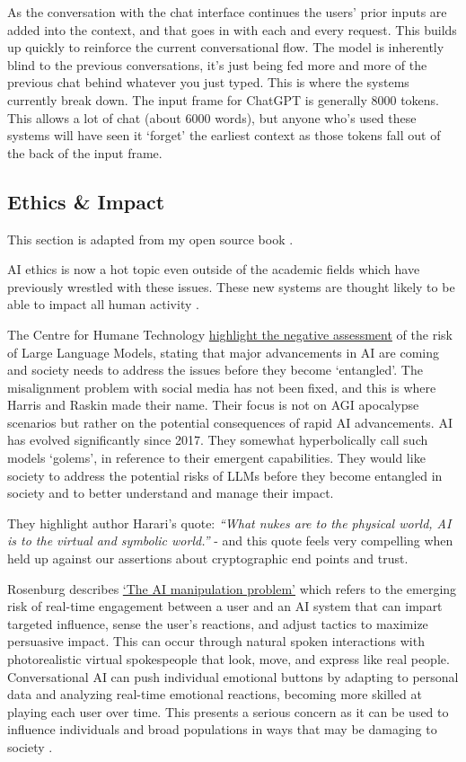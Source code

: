 As the conversation with the chat interface continues the users' prior inputs are added into the context, and that goes in with each and every request. This builds up quickly to reinforce the current conversational flow. The model is inherently blind to the previous conversations, it's just being fed more and more of the previous chat behind whatever you just typed. This is where the systems currently break down. The input frame for ChatGPT is generally 8000 tokens. This allows a lot of chat (about 6000 words), but anyone who's used these systems will have seen it `forget' the earliest context as those tokens fall out of the back of the input frame.\par 
\subsection{Ethics \& Impact}
This section is adapted from my open source book \cite{ohare2022money}.\par
AI ethics is now a hot topic even outside of the academic fields which have previously wrestled with these issues. These new systems are thought likely to be able to impact all human activity \cite{eloundou2023gpts}. \par
The Centre for Humane Technology \href{https://www.humanetech.com/key-issues}{highlight the negative assessment} of the risk of Large Language Models, stating that major advancements in AI are coming and society needs to address the issues before they become `entangled'. The misalignment problem with social media has not been fixed, and this is where Harris and Raskin made their name. Their focus is not on AGI apocalypse scenarios but rather on the potential consequences of rapid AI advancements. AI has evolved significantly since 2017. They somewhat hyperbolically call such models `golems', in reference to their emergent capabilities. They would like society to address the potential risks of LLMs before they become entangled in society and to better understand and manage their impact.\par
They highlight author \cite{harari2014sapiens} Harari's quote: \textit{``What nukes are to the physical world, AI is to the virtual and symbolic world.''} - and this quote feels very compelling when held up against our assertions about cryptographic end points and trust.\par
Rosenburg describes \href{https://bigthink.com/the-present/danger-conversational-ai/}{`The AI manipulation problem'} which refers to the emerging risk of real-time engagement between a user and an AI system that can impart targeted influence, sense the user's reactions, and adjust tactics to maximize persuasive impact. This can occur through natural spoken interactions with photorealistic virtual spokespeople that look, move, and express like real people. Conversational AI can push individual emotional buttons by adapting to personal data and analyzing real-time emotional reactions, becoming more skilled at playing each user over time. This presents a serious concern as it can be used to influence individuals and broad populations in ways that may be damaging to society \cite{Rosenberg2023}. \par
